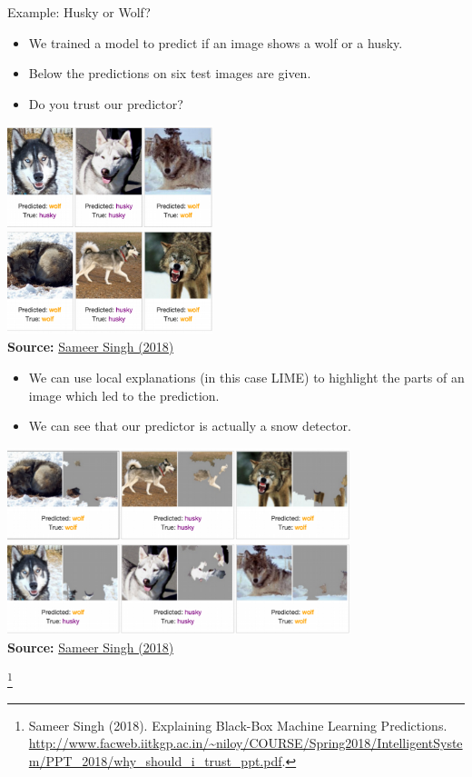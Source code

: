 \documentclass[11pt,compress,t,notes=noshow, xcolor=table]{beamer}
\begin{document}
\begin{vbframe}{Example: Husky or Wolf?}
	\begin{itemize}
		\item We trained a model to predict if an image shows a wolf or a husky. 
		\item Below the predictions on six test images are given. 
		\item Do you trust our predictor? 
	\end{itemize}
	\begin{center}
		\includegraphics[width=0.45\textwidth]{figure/lime-wolfhusky.png}\\
		\includegraphics[width=0.45\textwidth]{figure/lime-wolfhusky2.png}\\
		{\tiny \textbf{Source:} \href{http://www.facweb.iitkgp.ac.in/~niloy/COURSE/Spring2018/IntelligentSystem/PPT_2018/why_should_i_trust_ppt.pdf}{Sameer Singh (2018)}}
	\end{center}

	\framebreak
	
	\begin{itemize}
		\item We can use local explanations (in this case LIME) to highlight the parts of an image which led to the prediction.
		\item We can see that our predictor is actually a snow detector. 
	\end{itemize}
	\begin{center}
		\includegraphics[width=0.75\textwidth]{figure/lime-wolfhusky3.png}\\
		{\tiny \textbf{Source:} \href{http://www.facweb.iitkgp.ac.in/~niloy/COURSE/Spring2018/IntelligentSystem/PPT_2018/why_should_i_trust_ppt.pdf}{Sameer Singh (2018)}}
	\end{center}
\footnote[frame]{Sameer Singh (2018). Explaining Black-Box Machine Learning Predictions.  \url{http://www.facweb.iitkgp.ac.in/~niloy/COURSE/Spring2018/IntelligentSystem/PPT_2018/why_should_i_trust_ppt.pdf}.}
\end{vbframe}
\end{document}
